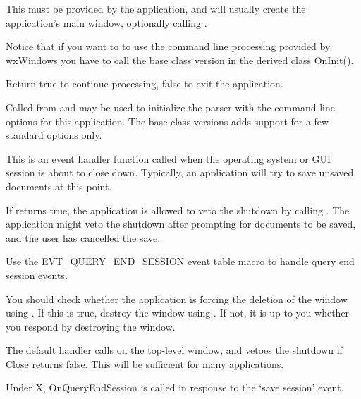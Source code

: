 This must be provided by the application, and will usually create the
application's main window, optionally calling 
.

Notice that if you want to to use the command line processing provided by
wxWindows you have to call the base class version in the derived class
OnInit().

Return true to continue processing, false to exit the application.


\label{wxapponinitcmdline}


Called from  and may be used to initialize the
parser with the command line options for this application. The base class
versions adds support for a few standard options only.


\label{wxapponqueryendsession}


This is an event handler function called when the operating system or GUI session is
about to close down. Typically, an application will try to save unsaved documents
at this point.

If  returns true, the application
is allowed to veto the shutdown by calling .
The application might veto the shutdown after prompting for documents to be saved, and the
user has cancelled the save.

Use the EVT\_QUERY\_END\_SESSION event table macro to handle query end session events.

You should check whether the application is forcing the deletion of the window
using . If this is true,
destroy the window using .
If not, it is up to you whether you respond by destroying the window.

The default handler calls  on the top-level window,
and vetoes the shutdown if Close returns false. This will be sufficient for many applications.


Under X, OnQueryEndSession is called in response to the `save session' event.

